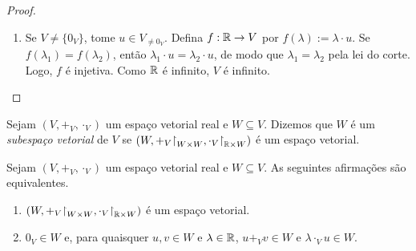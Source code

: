 \begin{proof}
\begin{enumerate}[leftmargin=*, align=left, label=\textbf{(\alph*)}]
\begin{enumerate}[label=\roman*.]
                    \item Se $\lambda \neq 0$ e $\lambda \cdot u=\lambda \cdot v$, então
                        \[
                            \frac{1}{\lambda} \cdot (\lambda \cdot u)
                            = \frac{1}{\lambda} \cdot (\lambda \cdot v),
                        \]
                    de modo que
                        \[
                            \left(\frac{1}{\lambda}\lambda\right) \cdot u
                            = \left(\frac{1}{\lambda}\lambda\right) \cdot v,
                        \]
                    isto é, $u=v$.
                    \item Se $u \neq 0_V$ e $\lambda_1 \cdot u=\lambda_2 \cdot u$, então
                        \[
                            0_V
                            = (\lambda_1 \cdot u) + (-(\lambda_2 \cdot u))
                            = (\lambda_1 \cdot u) + ((-\lambda_2) \cdot u)
                            = (\lambda_1-\lambda_2) \cdot u.
                        \]
                    Pela integridade, $\lambda_1-\lambda_2=0$ ou $u=0_V$. Como $u \neq 0_V$, temos $\lambda_1-\lambda_2=0$, de modo que $\lambda_1=\lambda_2$.
                \end{enumerate}
            Logo, valem as leis do corte. \blackproof
            \item Se $V \neq \{0_V\}$, tome $u \in V_{\neq 0_V}$. Defina $f:\mathbb{R} \to V$ por $f(\lambda):=\lambda \cdot u$. Se $f(\lambda_1)=f(\lambda_2)$, então $\lambda_1 \cdot u=\lambda_2 \cdot u$, de modo que $\lambda_1=\lambda_2$ pela lei do corte. Logo, $f$ é injetiva. Como $\mathbb{R}$ é infinito, $V$ é infinito. \blackproof
        \end{enumerate}
\end{proof}

\begin{definition}
    Sejam $(V, +_V, \cdot_V)$ um espaço vetorial real e $W \subseteq V$. Dizemos que $W$ é um \emph{subespaço vetorial} de $V$ se $(W, +_V \restriction_{W \times W}, \cdot_V \restriction_{\R \times W})$ é um espaço vetorial.
\end{definition}

\begin{proposition} 
    Sejam $(V, +_V, \cdot_V)$ um espaço vetorial real e $W \subseteq V$. As seguintes afirmações são equivalentes. 
        \begin{enumerate}[label=\roman*.]
            \item $(W, +_V \restriction_{W \times W}, \cdot_V \restriction_{\R \times W})$ é um espaço vetorial.
            \item $0_V \in W$ e, para quaisquer $u, v \in W$ e $\lambda \in \mathbb{R}$, $u +_V v \in W$ e $\lambda \cdot_V u \in W$.
        \end{enumerate}
\end{proposition}


